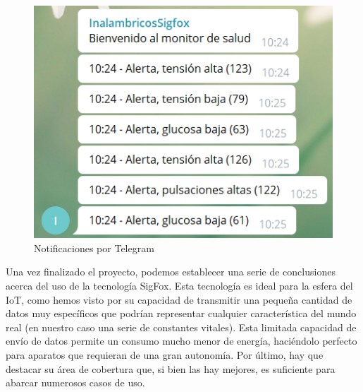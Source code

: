 \documentclass[12pt,a4paper]{article}
\begin{document}
\begin{figure}[!h]
\begin{center}
\includegraphics[scale=1]{notificaciones.png}
\caption{Notificaciones por Telegram}
\label{d}
\end{center}
\end{figure}


Una vez finalizado el proyecto, podemos establecer una serie de conclusiones acerca del uso de la tecnología SigFox. Esta tecnología es ideal para la esfera del IoT, como hemos visto por su capacidad de transmitir una pequeña cantidad de datos muy específicos que podrían representar cualquier característica del mundo real (en nuestro caso una serie de constantes vitales). Esta limitada capacidad de envío de datos permite un consumo mucho menor de energía, haciéndolo perfecto para aparatos que requieran de una gran autonomía. Por último, hay que destacar su área de cobertura que, si bien las hay mejores, es suficiente para abarcar numerosos casos de uso.

\newpage


\end{document}
